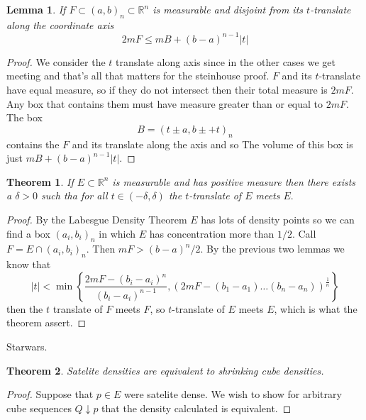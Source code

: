 \documentclass[letter]{article}
\newtheorem{theorem}{Theorem}
\newtheorem{lemma}{Lemma}
\newenvironment{menumerate}{%
  \edef\backupindent{\the\parindent}%
  \enumerate%
  \setlength{\parindent}{\backupindent}%
}{\endenumerate}
\begin{document}
\begin{menumerate}
	\begin{lemma}
			If $F \subset (a,b)_n \subset \mathbb{R}^n$ is measurable and disjoint from its $t$-translate along the coordinate axis
		\begin{equation}
			2mF \leq mB + (b-a)^{n-1}|t|
		\end{equation}
	\end{lemma}
	\begin{proof}
		We consider the $t$ translate along axis since in the other cases we get meeting and that's all that matters for the steinhouse proof.
		$F$ and its $t$-translate have equal measure, so if they do not intersect then their total measure is $2mF$. Any box that contains them must have measure greater than or equal to $2mF$.
		The box 
		\begin{equation}
			B = (t \pm a,b \pm+ t)_n
		\end{equation}
		contains the $F$ and its translate along the axis and so 
		The volume of this box is just $mB + (b-a)^{n-1}|t|$.
	\end{proof}
	\begin{theorem}
		If $E \subset \mathbb{R}^n$ is measurable and has positive measure then there exists a $\delta > 0$ such tha for all $t\in (-\delta, \delta)$ the $t$-translate of $E$ meets $E.$ 
	\end{theorem}
	\begin{proof}
		By the Labesgue Density Theorem $E$ has lots of density points so we can find a box $(a_i,b_i)_n$ in which $E$ has concentration more than $1/2$.
		Call $F = E \cap (a_i,b_i)_n$. Then $mF > (b-a)^n/2$. By the previous two lemmas we know that 
		\begin{equation}
			|t| < \min\left\{\frac{2mF - (b_i-a_i)^n}{(b_i - a_i)^{n-1}}, \left(
				2mF - (b_1-a_1)\dots(b_n - a_n)
			\right)^{\frac{1}{n}}\right\}
		\end{equation}
		then the $t$ translate of $F$ meets $F$, 
		so $t$-translate of $E$ meets $E$, which is what the theorem assert. 
	\end{proof}


	\setcounter{enumi}{59}
	\item Starwars.
	 \begin{theorem}
		Satelite densities are equivalent to shrinking cube densities.
	\end{theorem}
	\begin{proof}
		Suppose that $p \in E$ were satelite dense. We wish to show for arbitrary cube sequences $Q\downarrow p$ that the density calculated is equivalent.


\end{proof}
\end{menumerate}
\end{document}
